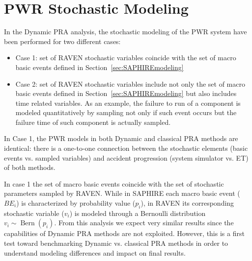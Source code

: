 \section{PWR Stochastic Modeling}
\label{PWRstochasticModeling}

In the Dynamic PRA analysis, the stochastic modeling of the PWR system have been performed
for two different cases:
\begin{itemize}
	\item Case 1: set of RAVEN stochastic variables coincide with the set of macro basic events
	      defined in Section~\ref{sec:SAPHIREmodeling}
	\item Case 2: set of RAVEN stochastic variables include not only the set of macro basic events
	      defined in Section~\ref{sec:SAPHIREmodeling} but also includes time related variables. As an example, 
	      the failure to run of a component is modeled quantitatively by sampling not only if such 
	      event occurs but the failure time of such component is actually sampled.
\end{itemize}

In Case 1, the PWR models in both Dynamic and classical PRA methods are identical: there is a 
one-to-one connection between the stochastic elements (basic events vs. sampled variables) and
accident progression (system simulator vs. ET) of both methods.

In case 1 the set of macro basic events coincide with the set of stochastic parameters sampled
by RAVEN. While in SAPHIRE each macro basic event ($BE_i$) is characterized by probability value 
($p_i$), in RAVEN its corresponding stochastic variable ($v_i$) is modeled through a Bernoulli 
distribution $v_i \sim \operatorname{Bern}(p_i)$.
From this analysis we expect very similar results since the capabilities of Dynamic PRA methods
are not exploited.
However, this is a first test toward benchmarking Dynamic vs. classical PRA methods in order to 
understand modeling differences and impact on final results.

